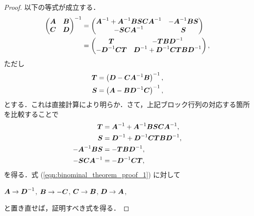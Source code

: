 \begin{proof}
以下の等式が成立する．
\begin{align*}
    \begin{pmatrix}
        \boldsymbol{A} & \boldsymbol{B} \\
        \boldsymbol{C} & \boldsymbol{D}
    \end{pmatrix}^{-1}
    &= \begin{pmatrix}
        \boldsymbol{A}^{-1} + \boldsymbol{A}^{-1}\boldsymbol{BSCA}^{-1} & - \boldsymbol{A}^{-1}\boldsymbol{BS} \\
        - \boldsymbol{SCA}^{-1}                         & \boldsymbol{S}
    \end{pmatrix} \\
    &= \begin{pmatrix}
        \boldsymbol{T}                & - \boldsymbol{TBD}^{-1} \\
        - \boldsymbol{D}^{-1} \boldsymbol{CT} & \boldsymbol{D}^{-1} + \boldsymbol{D}^{-1} \boldsymbol{CTBD}^{-1}
    \end{pmatrix},
\end{align*}
ただし
\begin{align}
    \boldsymbol{T} &= \left( \boldsymbol{D} - \boldsymbol{CA}^{-1} \boldsymbol{B} \right)^{-1}, \\
    \boldsymbol{S} &= \left( \boldsymbol{A} - \boldsymbol{BD}^{-1} \boldsymbol{C} \right)^{-1},
\end{align}
とする．これは直接計算により明らか．さて，上記ブロック行列の対応する箇所を比較することで
\begin{align}
    \boldsymbol{T} &= \boldsymbol{A}^{-1} + \boldsymbol{A}^{-1}\boldsymbol{BSCA}^{-1},
    \label{eqn:binominal_theorem_proof_1} \\
    \boldsymbol{S} &= \boldsymbol{D}^{-1} + \boldsymbol{D}^{-1} \boldsymbol{CTBD}^{-1}, \\
    - \boldsymbol{A}^{-1} \boldsymbol{BS} &= - \boldsymbol{TBD}^{-1}, \\
    - \boldsymbol{SCA}^{-1} &= - \boldsymbol{D}^{-1} \boldsymbol{CT},
\end{align}
を得る．式 (\ref{eqn:binominal_theorem_proof_1}) に対して
\begin{center}
    $\boldsymbol{A} \to \boldsymbol{D}^{-1}$, \hspace{5pt}
    $\boldsymbol{B} \to - \boldsymbol{C}$, \hspace{5pt}
    $\boldsymbol{C} \to \boldsymbol{B}$, \hspace{5pt}
    $\boldsymbol{D} \to \boldsymbol{A}$,
\end{center}
と置き直せば，証明すべき式を得る．
\end{proof}

